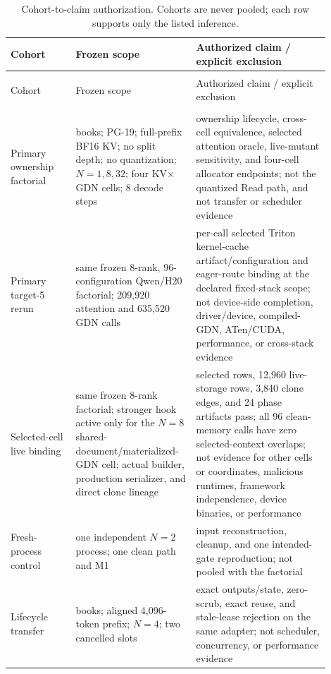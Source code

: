 \documentclass{article}
\begin{document}
\begingroup
\footnotesize
\setlength{\LTpre}{0pt}
\setlength{\LTpost}{0pt}
\begin{longtable}{@{}>{\raggedright\arraybackslash}p{0.19\linewidth}>{\raggedright\arraybackslash}p{0.32\linewidth}>{\raggedright\arraybackslash}p{0.39\linewidth}@{}}
  \caption{Cohort-to-claim authorization.  Cohorts are never pooled; each row
  supports only the listed inference.}
  \label{tab:cohorts}\\
  \toprule
  Cohort & Frozen scope & Authorized claim / explicit exclusion \\
  \midrule
  \endfirsthead
  \multicolumn{3}{c}{\textit{Table~\ref{tab:cohorts} continued.}}\\
  \toprule
  Cohort & Frozen scope & Authorized claim / explicit exclusion \\
  \midrule
  \endhead
  \midrule
  \multicolumn{3}{r}{\textit{Continued on next page}}\\
  \endfoot
  \bottomrule
  \endlastfoot
  Primary ownership factorial & 8 books; PG-19; full-prefix BF16 KV; no split depth; no quantization; $N=1,8,32$; four KV$\times$GDN cells; 8 decode steps & ownership lifecycle, cross-cell equivalence, selected attention oracle, live-mutant sensitivity, and four-cell allocator endpoints; not the quantized Read path, and not transfer or scheduler evidence \\
  Primary target-5 rerun & same frozen 8-rank, 96-configuration Qwen/H20 factorial; 209,920 attention and 635,520 GDN calls & per-call selected Triton kernel-cache artifact/configuration and eager-route binding at the declared fixed-stack scope; not device-side completion, driver/device, compiled-GDN, ATen/CUDA, performance, or cross-stack evidence \\
  Selected-cell live binding & same frozen 8-rank factorial; stronger hook active only for the $N=8$ shared-document/materialized-GDN cell; actual builder, production serializer, and direct clone lineage & 144 selected rows, 12,960 live-storage rows, 3,840 clone edges, and 24 phase artifacts pass; all 96 clean-memory calls have zero selected-context overlaps; not evidence for other cells or coordinates, malicious runtimes, framework independence, device binaries, or performance \\
  Fresh-process control & one independent $N=2$ process; one clean path and M1 & input reconstruction, cleanup, and one intended-gate reproduction; not pooled with the factorial \\
  Lifecycle transfer & 8 books; aligned 4,096-token prefix; $N=4$; two cancelled slots & exact outputs/state, zero-scrub, exact reuse, and stale-lease rejection on the same adapter; not scheduler, concurrency, or performance evidence \\

\end{longtable}
\end{document}
